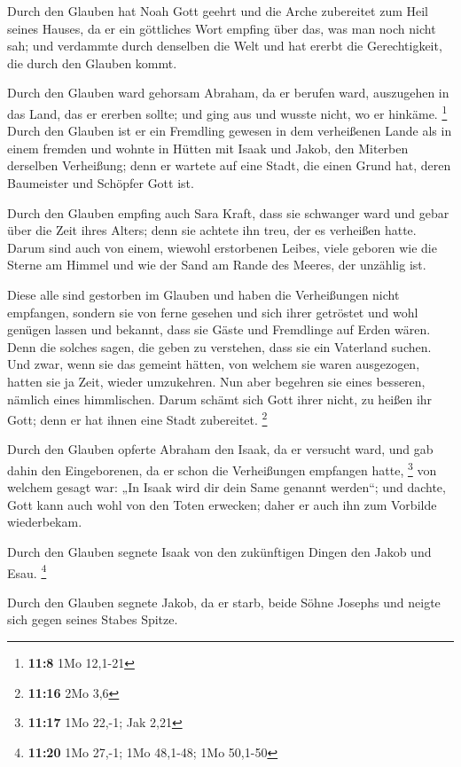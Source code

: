  Durch den Glauben hat Noah Gott geehrt und die Arche
zubereitet zum Heil seines Hauses, da er ein göttliches Wort empfing
über das, was man noch nicht sah; und verdammte durch denselben die Welt
und hat ererbt die Gerechtigkeit, die durch den Glauben kommt.

 Durch den Glauben ward gehorsam Abraham, da er berufen
ward, auszugehen in das Land, das er ererben sollte; und ging aus und
wusste nicht, wo er hinkäme. \footnote{\textbf{11:8} 1Mo 12,1-21}
 Durch den Glauben ist er ein Fremdling gewesen in dem
verheißenen Lande als in einem fremden und wohnte in Hütten mit Isaak
und Jakob, den Miterben derselben Verheißung;  denn er
wartete auf eine Stadt, die einen Grund hat, deren Baumeister und
Schöpfer Gott ist.

 Durch den Glauben empfing auch Sara Kraft, dass sie
schwanger ward und gebar über die Zeit ihres Alters; denn sie achtete
ihn treu, der es verheißen hatte.  Darum sind auch von
einem, wiewohl erstorbenen Leibes, viele geboren wie die Sterne am
Himmel und wie der Sand am Rande des Meeres, der unzählig ist.

 Diese alle sind gestorben im Glauben und haben die
Verheißungen nicht empfangen, sondern sie von ferne gesehen und sich
ihrer getröstet und wohl genügen lassen und bekannt, dass sie Gäste und
Fremdlinge auf Erden wären.  Denn die solches sagen, die
geben zu verstehen, dass sie ein Vaterland suchen.  Und
zwar, wenn sie das gemeint hätten, von welchem sie waren ausgezogen,
hatten sie ja Zeit, wieder umzukehren.  Nun aber begehren
sie eines besseren, nämlich eines himmlischen. Darum schämt sich Gott
ihrer nicht, zu heißen ihr Gott; denn er hat ihnen eine Stadt
zubereitet. \footnote{\textbf{11:16} 2Mo 3,6}

 Durch den Glauben opferte Abraham den Isaak, da er
versucht ward, und gab dahin den Eingeborenen, da er schon die
Verheißungen empfangen hatte, \footnote{\textbf{11:17} 1Mo 22,-1; Jak
  2,21}  von welchem gesagt war: „In Isaak wird dir dein
Same genannt werden``;  und dachte, Gott kann auch wohl von
den Toten erwecken; daher er auch ihn zum Vorbilde wiederbekam.

 Durch den Glauben segnete Isaak von den zukünftigen Dingen
den Jakob und Esau. \footnote{\textbf{11:20} 1Mo 27,-1; 1Mo 48,1-48; 1Mo
  50,1-50}

 Durch den Glauben segnete Jakob, da er starb, beide Söhne
Josephs und neigte sich gegen seines Stabes Spitze.

